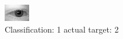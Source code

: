 \begin{figure}[h!]
\begin{center}
\includegraphics[width=0.60\columnwidth]{figures/ID397_class_1_target_2.png}
\end{center}
\caption{ Classification: 1 actual target: 2}
\label{fig:ID397_class_1_target_2}
\end{figure}
